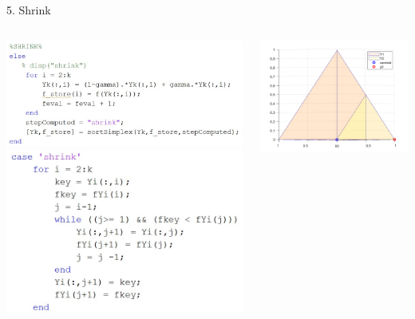 \documentclass{beamer}
\begin{document}
\begin{frame}{5. Shrink}
	\begin{columns}
	\begin{column}{0.39\linewidth}
		\centering
		\includegraphics[width=0.95\linewidth]{Shrink}
		\includegraphics[width=0.85\linewidth]{Shrink2}
	\end{column}
	\begin{column}{0.59\linewidth}
		\centering
		\includegraphics[width=0.95\linewidth]{ShrinkFig}
	\end{column}
	\end{columns}
\end{frame}
\end{document}
